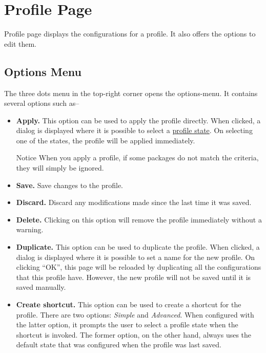 \section{Profile Page}\label{sec:profile-page} %
Profile page displays the configurations for a profile. It also offers the options to edit them.

\subsection{Options Menu}\label{subsec:profile-options-menu} %
The three dots menu in the top-right corner opens the options-menu. It contains several options such as--
\begin{itemize}
    \item \textbf{Apply.} This option can be used to apply the profile directly. When
    clicked, a dialog is displayed where it is possible to select a \hyperref[subsubsec:profile-state]{profile state}.
    On selecting one of the states, the profile will be applied immediately.
    \begin{tip}{Notice}
        When you apply a profile, if some packages do not match the criteria, they will simply be ignored.
    \end{tip}

    \item \textbf{Save.} Save changes to the profile.

    \item \textbf{Discard.} Discard any modifications made since the last time it was saved.

    \item \textbf{Delete.} Clicking on this option will remove the profile immediately without a warning.

    \item \textbf{Duplicate.} This option can be used to duplicate the profile. When clicked, a
    dialog is displayed where it is possible to set a name for the new profile. On clicking ``OK'',
    this page will be reloaded by duplicating all the configurations that this profile have.
    However, the new profile will not be saved until it is saved manually.

    \item \textbf{Create shortcut.} This option can be used to create a shortcut for the profile.
    There are two options: \textit{Simple} and \textit{Advanced}. When configured with the latter
    option, it prompts the user to select a profile state when the shortcut is invoked. The former
    option, on the other hand, always uses the default state that was configured when the profile
    was last saved.
\end{itemize}

